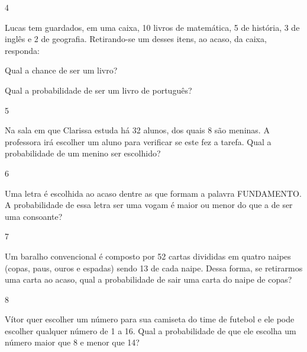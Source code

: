 \begin{escolha}
{\begin{escolha}

\num{4}

Lucas tem guardados, em uma caixa, 10 livros de matemática, 5 de história, 3 de inglês e
2 de geografia. Retirando-se um desses itens, ao acaso, da caixa,
responda:

\begin{escolha}

\item
 Qual a chance de ser um livro?

\item
  Qual a probabilidade de ser um livro de português?

\end{escolha}

\num{5}

Na sala em que Clarissa estuda há 32 alunos, dos quais 8 são meninas. A
professora irá escolher um aluno para verificar se este fez a tarefa.
Qual a probabilidade de um menino ser escolhido?


\num{6}

Uma letra é escolhida ao acaso dentre as que formam a palavra
FUNDAMENTO. A probabilidade de essa letra ser uma vogam é maior ou menor do que a de ser uma consoante?


\num{7}

Um baralho convencional é composto por 52 cartas divididas em quatro
naipes (copas, paus, ouros e espadas) sendo 13 de cada naipe. Dessa
forma, se retirarmos uma carta ao acaso, qual a probabilidade de sair
uma carta do naipe de copas?


\num{8}

Vítor quer escolher um número para sua camiseta do time de futebol e ele
pode escolher qualquer número de 1 a 16. Qual a probabilidade de que ele
escolha um número maior que 8 e menor que 14?


\end{escolha}}
\end{escolha}
